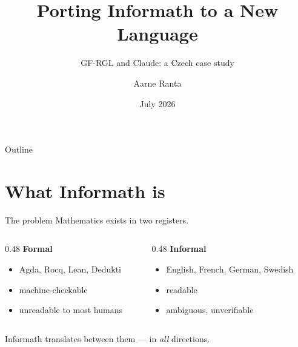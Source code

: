 \documentclass[10pt,aspectratio=169]{beamer}
\title{Porting Informath to a New Language}
\subtitle{GF-RGL and Claude: a Czech case study}
\author{Aarne Ranta}
\date{July 2026}
\begin{document}
\maketitle

\begin{frame}{Outline}
  \tableofcontents
\end{frame}

\section{What Informath is}

\begin{frame}{The problem}
  Mathematics exists in two registers.

  \begin{columns}[T]
    \begin{column}{0.48\textwidth}
      \textbf{Formal}
      \begin{itemize}
        \item Agda, Rocq, Lean, Dedukti
        \item machine-checkable
        \item unreadable to most humans
      \end{itemize}
    \end{column}
    \begin{column}{0.48\textwidth}
      \textbf{Informal}
      \begin{itemize}
        \item English, French, German, Swedish
        \item readable
        \item ambiguous, unverifiable
      \end{itemize}
    \end{column}
  \end{columns}

  \vspace{1em}
  Informath translates between them --- in \emph{all} directions.
\end{frame}
\end{document}
